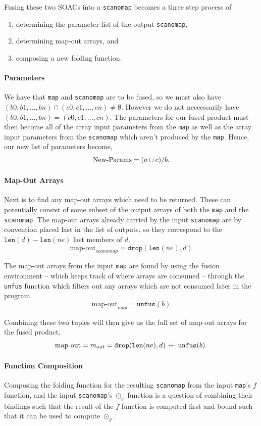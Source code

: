 \documentclass[11pt]{article}
\newcommand\doubleplus{+\kern-1.3ex+\kern0.8ex}
\begin{document}
Fusing these two SOACs into a \texttt{scanomap} becomes a three step process of
\begin{enumerate}
\item determining the parameter list of the output \texttt{scanomap},
\item determining map-out arrays, and
\item composing a new folding function.
\end{enumerate}

\paragraph{Parameters}

We have that \texttt{map} and \texttt{scanomap} are to be fused, so we must also have $(b0, b1, ...,bn) \cap (c0, c1, ..., cn) \neq \emptyset$. However
 we do not neccessarily have $(b0, b1, ...,bn) = (c0, c1, ..., cn)$. The parameters for our fused product must then become all of the array input parameters from the \texttt{map} as well as
 the array input parameters from the \texttt{scanomap} which aren't produced by the \texttt{map}. Hence, our new list of parameters become,
$$\text{New-Params} = (a \cup c) / b\mathnormal{.}$$


\paragraph{Map-Out Arrays}
Next is to find any map-out arrays which need to be returned. These can potentially consist of some subset of the output arrays of both the \texttt{map} and the \texttt{scanomap}. The map-out arrays
 already carried by the input \texttt{scanomap} are by convention placed last in the list of outputs, so they correspond to the $\mathtt{len}(d) - \mathtt{len}(ne)$ last members of $d$.
$$\text{map-out}_{scanomap} = \mathtt{drop}(\mathtt{len}(ne),d)$$

The map-out arrays from the input \texttt{map} are found by using the fusion environment
 -- which keeps track of where arrays are consumed -- through the \texttt{unfus} function which
 filters out any arrays which are not consumed later in the program.
$$\text{map-out}_{map} = \mathtt{unfus} (b)$$

Combining these two tuples will then give us the full set of map-out arrays for the fused product,
$$\text{map-out} = m_{out} = \mathtt{drop}(\mathtt{len}(ne),d) \doubleplus \mathtt{unfus} (b)\mathnormal{.}$$
\paragraph{Function Composition}
\setcounter{equation}{0}
Composing the folding function for the resulting \texttt{scanomap} from the input \texttt{map}'s $f$ function, and the input \texttt{scanomap}'s $\odot_g$ function is a question of combining their
 bindings such that the result of the $f$ function is computed first and bound such that it can be used to compute $\odot_g$.
\end{document}
